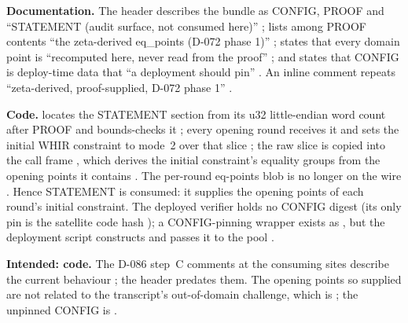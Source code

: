 \begin{specdelta}
\label{delta:whirhdr}
\textbf{Documentation.} The  header describes the bundle
as CONFIG, PROOF and ``STATEMENT (audit surface, not consumed here)''
; lists among PROOF
contents ``the zeta-derived eq\_points (D-072 phase 1)''
; states that every domain
point is ``recomputed here, never read from the proof''
; and states that CONFIG is
deploy-time data that ``a deployment should pin''
. An inline comment repeats
``zeta-derived, proof-supplied, D-072 phase 1''
.

\textbf{Code.}  locates the STATEMENT section from its u32
little-endian word count after PROOF and bounds-checks it
; every opening round
receives it  and sets the
initial WHIR constraint to mode~2 over that slice
; the raw slice is copied
into the  call frame
, which derives the
initial constraint's equality groups from the opening points it contains
. The per-round
eq-points blob is no longer on the wire
. Hence STATEMENT is
consumed: it supplies the opening points of each round's initial constraint.
The deployed verifier holds no CONFIG digest (its only pin is the satellite
code hash ); a
CONFIG-pinning wrapper exists as 
, but the deployment
script constructs  and passes it to the pool
.

\textbf{Intended: code.} The D-086 step~C comments at the consuming sites
describe the current behaviour
; the
header predates them. The opening points so supplied are not related to the
transcript's out-of-domain challenge, which is ; the unpinned
CONFIG is .
\end{specdelta}

